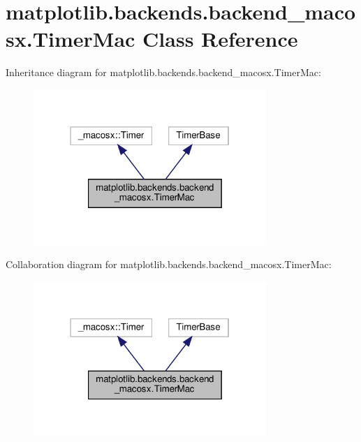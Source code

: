 \hypertarget{classmatplotlib_1_1backends_1_1backend__macosx_1_1TimerMac}{}\section{matplotlib.\+backends.\+backend\+\_\+macosx.\+Timer\+Mac Class Reference}
\label{classmatplotlib_1_1backends_1_1backend__macosx_1_1TimerMac}


Inheritance diagram for matplotlib.\+backends.\+backend\+\_\+macosx.\+Timer\+Mac\+:
\nopagebreak
\begin{figure}[H]
\begin{center}
\leavevmode
\includegraphics[width=250pt]{classmatplotlib_1_1backends_1_1backend__macosx_1_1TimerMac__inherit__graph}
\end{center}
\end{figure}


Collaboration diagram for matplotlib.\+backends.\+backend\+\_\+macosx.\+Timer\+Mac\+:
\nopagebreak
\begin{figure}[H]
\begin{center}
\leavevmode
\includegraphics[width=250pt]{classmatplotlib_1_1backends_1_1backend__macosx_1_1TimerMac__coll__graph}
\end{center}
\end{figure}


